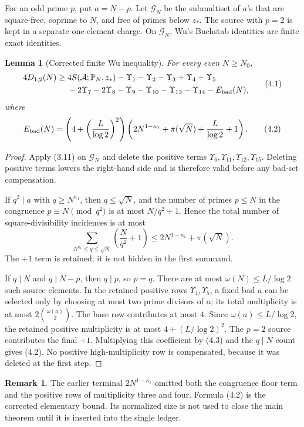 \documentclass[11pt]{article}
\newtheorem{lemma}[theorem]{Lemma}
\theoremstyle{definition}
\newtheorem{remark}[theorem]{Remark}
\newcommand{\cA}{\mathcal A}
\newcommand{\cG}{\mathcal G}
\newcommand{\Ups}{\Upsilon}
\begin{document}
For an odd prime \(p\), put \(a=N-p\).  Let \(\cG_N\) be the submultiset
of \(a\)'s that are square-free, coprime to \(N\), and free of primes below
\(z_*\).  The source with \(p=2\) is kept in a separate one-element charge.
On \(\cG_N\), Wu's Buchstab identities are finite exact identities.

\begin{lemma}[Corrected finite Wu inequality]
\label{lem:wu-corrected}
For every even \(N\ge N_0\),
\[
\begin{aligned}
4D_{1,2}(N)\ge{}&
4S(\cA;\mathbb P_N,z_*)-\Ups_1-\Ups_2-\Ups_3
 +\Ups_4+\Ups_5\\
&-2\Ups_7-2\Ups_8-\Ups_9-\Ups_{10}
 -\Ups_{13}-\Ups_{14}-E_{\rm bad}(N),
\end{aligned}
\tag{4.1}
\]
where
\[
 E_{\rm bad}(N)=
 \left(4+\left(\frac L{\log2}\right)^2\right)
 \left(2N^{1-\kappa_1}+\pi(\sqrt N)+\frac L{\log2}+1\right).
\tag{4.2}
\]
\end{lemma}

\begin{proof}
Apply (3.11) on \(\cG_N\) and delete the positive terms
\(\Ups_6,\Ups_{11},\Ups_{12},\Ups_{15}\).  Deleting positive terms lowers
the right-hand side and is therefore valid before any bad-set compensation.

If \(q^2\mid a\) with \(q\ge N^{\kappa_1}\), then \(q\le\sqrt N\), and the
number of primes \(p\le N\) in the congruence \(p\equiv N\pmod {q^2}\) is at
most \(N/q^2+1\).  Hence the total number of square-divisibility
incidences is at most
\[
 \sum_{N^{\kappa_1}\le q\le\sqrt N}\left(\frac N{q^2}+1\right)
 \le 2N^{1-\kappa_1}+\pi(\sqrt N).
\tag{4.3}
\]
The \(+1\) term is retained; it is not hidden in the first summand.

If \(q\mid N\) and \(q\mid N-p\), then \(q\mid p\), so \(p=q\).  There are
at most \(\omega(N)\le L/\log2\) such source elements.  In the retained
positive rows \(\Ups_4,\Ups_5\), a fixed bad \(a\) can be selected only by
choosing at most two prime divisors of \(a\); its total multiplicity is at
most \(2\binom{\omega(a)}2\).  The base row contributes at most \(4\).
Since \(\omega(a)\le L/\log2\), the retained positive multiplicity is
at most \(4+(L/\log2)^2\).  The \(p=2\) source contributes the final \(+1\).
Multiplying this coefficient by (4.3) and the \(q\mid N\) count gives
(4.2).  No positive high-multiplicity row is compensated, because it was
deleted at the first step.
\end{proof}

\begin{remark}
The earlier terminal \(2N^{1-\kappa_1}\) omitted both the congruence
floor term and the positive rows of multiplicity three and four.  Formula
(4.2) is the corrected elementary bound.  Its normalized size is not used
to close the main theorem until it is inserted into the single ledger.
\end{remark}
\end{document}
